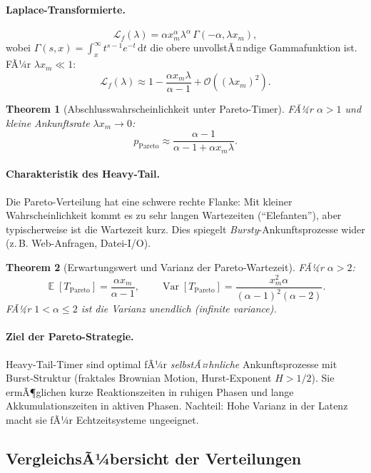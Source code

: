 ﻿\documentclass[12pt, a4paper]{article}
\newtheorem{theorem}{Theorem}[section]
\DeclareMathOperator{\E}{\mathbb{E}}
\DeclareMathOperator{\Var}{Var}
\newcommand{\Pareto}{\mathrm{Pareto}}
\begin{document}
\paragraph{Laplace-Transformierte.}
\[
  \mathcal{L}_f(\lambda) = \alpha x_m^\alpha \lambda^\alpha
  \, \Gamma(-\alpha, \lambda x_m),
\]
wobei $\Gamma(s, x) = \int_x^\infty t^{s-1} e^{-t}\,\mathrm{d}t$ die obere
unvollstÃ¤ndige Gammafunktion ist. FÃ¼r $\lambda x_m \ll 1$:
\[
  \mathcal{L}_f(\lambda) \approx 1 - \frac{\alpha x_m \lambda}{\alpha - 1} +
  \mathcal{O}((\lambda x_m)^2).
\]

\begin{theorem}[Abschlusswahrscheinlichkeit unter Pareto-Timer]
\label{thm:pareto}
FÃ¼r $\alpha > 1$ und kleine Ankunftsrate $\lambda x_m \to 0$:
\[
  p_{\Pareto} \approx \frac{\alpha - 1}{\alpha - 1 + \alpha x_m \lambda}.
\]
\end{theorem}

\paragraph{Charakteristik des Heavy-Tail.}
Die Pareto-Verteilung hat eine schwere rechte Flanke: Mit kleiner
Wahrscheinlichkeit kommt es zu sehr langen Wartezeiten (``Elefanten''), aber
typischerweise ist die Wartezeit kurz. Dies spiegelt \emph{Bursty}-Ankunftsprozesse
wider (z.\,B. Web-Anfragen, Datei-I/O).

\begin{theorem}[Erwartungswert und Varianz der Pareto-Wartezeit]
\label{thm:paretoev}
FÃ¼r $\alpha > 2$:
\[
  \E[T_{\Pareto}] = \frac{\alpha x_m}{\alpha-1}, \qquad
  \Var[T_{\Pareto}] = \frac{x_m^2 \alpha}{(\alpha-1)^2(\alpha-2)}.
\]
FÃ¼r $1 < \alpha \leq 2$ ist die Varianz unendlich (\emph{infinite variance}).
\end{theorem}

\paragraph{Ziel der Pareto-Strategie.}
Heavy-Tail-Timer sind optimal fÃ¼r \emph{selbstÃ¤hnliche} Ankunftsprozesse mit
Burst-Struktur (fraktales Brownian Motion, Hurst-Exponent $H > 1/2$). Sie
ermÃ¶glichen kurze Reaktionszeiten in ruhigen Phasen und lange Akkumulationszeiten
in aktiven Phasen. Nachteil: Hohe Varianz in der Latenz macht sie fÃ¼r
Echtzeitsysteme ungeeignet.

\subsection{VergleichsÃ¼bersicht der Verteilungen}
\end{document}
